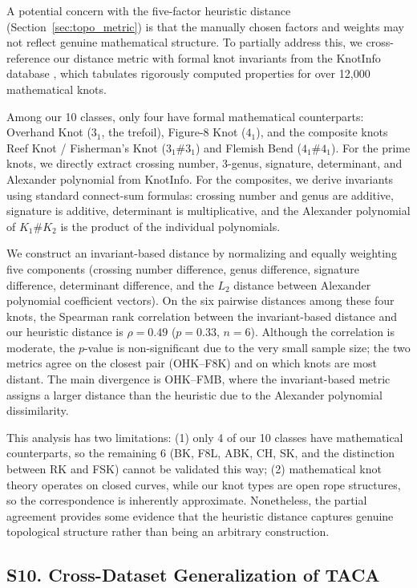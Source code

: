 \documentclass[preprint,review,12pt]{elsarticle}
\begin{document}
A potential concern with the five-factor heuristic distance (Section~\ref{sec:topo_metric}) is that the manually chosen factors and weights may not reflect genuine mathematical structure. To partially address this, we cross-reference our distance metric with formal knot invariants from the KnotInfo database \citep{knotinfo2025}, which tabulates rigorously computed properties for over 12{,}000 mathematical knots.

Among our 10 classes, only four have formal mathematical counterparts: Overhand Knot ($3_1$, the trefoil), Figure-8 Knot ($4_1$), and the composite knots Reef Knot / Fisherman's Knot ($3_1 \# 3_1$) and Flemish Bend ($4_1 \# 4_1$). For the prime knots, we directly extract crossing number, 3-genus, signature, determinant, and Alexander polynomial from KnotInfo. For the composites, we derive invariants using standard connect-sum formulas: crossing number and genus are additive, signature is additive, determinant is multiplicative, and the Alexander polynomial of $K_1 \# K_2$ is the product of the individual polynomials.

We construct an invariant-based distance by normalizing and equally weighting five components (crossing number difference, genus difference, signature difference, determinant difference, and the $L_2$ distance between Alexander polynomial coefficient vectors). On the six pairwise distances among these four knots, the Spearman rank correlation between the invariant-based distance and our heuristic distance is $\rho = 0.49$ ($p = 0.33$, $n = 6$). Although the correlation is moderate, the $p$-value is non-significant due to the very small sample size; the two metrics agree on the closest pair (OHK--F8K) and on which knots are most distant. The main divergence is OHK--FMB, where the invariant-based metric assigns a larger distance than the heuristic due to the Alexander polynomial dissimilarity.

This analysis has two limitations: (1) only 4 of our 10 classes have mathematical counterparts, so the remaining 6 (BK, F8L, ABK, CH, SK, and the distinction between RK and FSK) cannot be validated this way; (2) mathematical knot theory operates on closed curves, while our knot types are open rope structures, so the correspondence is inherently approximate. Nonetheless, the partial agreement provides some evidence that the heuristic distance captures genuine topological structure rather than being an arbitrary construction.

\subsection*{S10. Cross-Dataset Generalization of TACA}\label{sec:supp_crossdataset}
\end{document}
